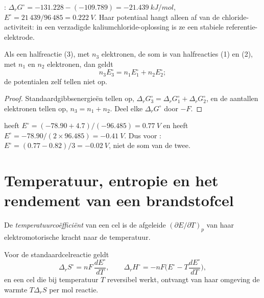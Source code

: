 \begin{example}\label{ex:b2:cell-thermodynamics:agcl}
: $\Delta_r G^\circ = -131.228 - (-109.789) =
\qty{-21.439}{kJ/mol}$, $E^\circ = 21\,439/96\,485 = \qty{0.222}{V}$. Haar potentiaal
hangt alleen af van de chloride-activiteit: in een verzadigde kaliumchloride-oplossing
is ze een stabiele referentie-elektrode.
\end{example}

\begin{proposition}\label{prop:b2:cell-thermodynamics:combining}
Als een halfreactie (3), met $n_3$ elektronen, de som is van halfreacties (1)
en (2), met $n_1$ en $n_2$ elektronen, dan geldt
\[
  n_3E_3^\circ = n_1E_1^\circ + n_2E_2^\circ ;
\]
de potentialen zelf tellen niet op.
\end{proposition}

\begin{proof}
Standaardgibbsenergieën tellen op, $\Delta_r G_3^\circ = \Delta_r G_1^\circ + \Delta_r
G_2^\circ$, en de aantallen elektronen tellen op, $n_3 = n_1 + n_2$. Deel elke $\Delta_r
G^\circ$ door $-F$.
\end{proof}

\begin{example}\label{ex:b2:cell-thermodynamics:iron}
 heeft $E^\circ = (-78.90 + 4.7)/(-96.485) = \qty{0.77}{V}$
en  heeft $E^\circ = -78.90/(2 \times 96.485) =
\qty{-0.41}{V}$. Dus voor : $E^\circ = (0.77 - 0.82)/3 =
\qty{-0.02}{V}$, niet de som van de twee.
\end{example}

\section{Temperatuur, entropie en het rendement van een brandstofcel}

\begin{definition}[Temperatuurcoëfficiënt]\label{def:b2:cell-thermodynamics:temperature-coefficient}
De \emph{temperatuurcoëfficiënt} van een cel is
de afgeleide $(\partial E/\partial T)_p$ van haar elektromotorische kracht naar
de temperatuur.
\end{definition}

\begin{proposition}\label{prop:b2:cell-thermodynamics:entropy}
Voor de standaardcelreactie geldt
\[
  \Delta_r S^\circ = nF\,\frac{dE^\circ}{dT}, \qquad
  \Delta_r H^\circ = -nF\Big(E^\circ - T\frac{dE^\circ}{dT}\Big),
\]
en een cel die bij temperatuur $T$ reversibel werkt, ontvangt van haar
omgeving de warmte $T\Delta_r S$ per mol reactie.
\end{proposition}

